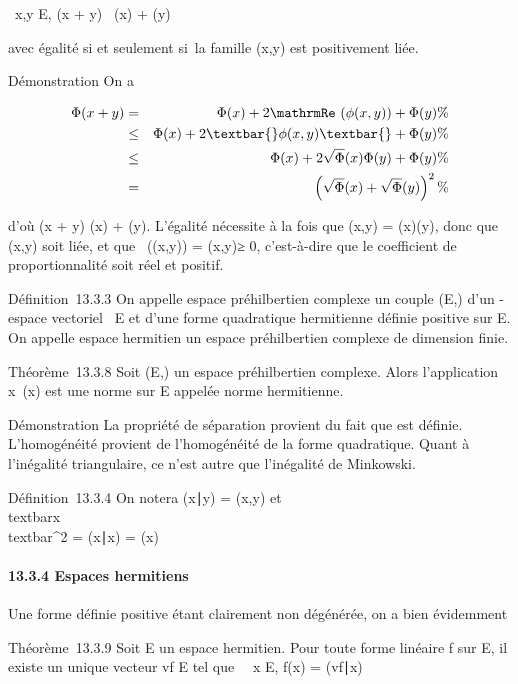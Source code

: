 \forall~x,y \in E, \sqrt\Phi(x + y)~
\leq\sqrt\Phi(x) + \sqrt\Phi(y)

avec égalité si et seulement si~la famille (x,y) est positivement liée.

Démonstration On a

\begin{align*} \Phi(x + y)& =& \Phi(x) +
2\mathrmRe~(\phi(x,y)) +
\Phi(y)\%& \\ & \leq& \Phi(x) +
2\textbar{}\phi(x,y)\textbar{} + \Phi(y) \%& \\
& \leq& \Phi(x) + 2\sqrt\Phi(x)\Phi(y) + \Phi(y)\%&
\\ & =& \left
(\sqrt\Phi(x) +
\sqrt\Phi(y)\right )^2 \%&
\\ \end{align*}

d'où \sqrt\Phi(x + y) \leq\sqrt\Phi(x) +
\sqrt\Phi(y). L'égalité nécessite à la fois que
\textbar{}\phi(x,y)\textbar{} = \sqrt\Phi(x)\Phi(y), donc que
(x,y) soit liée, et que
\mathrmRe~(\phi(x,y)) =
\textbar{}\phi(x,y)\textbar{}≥ 0, c'est-à-dire que le coefficient de
proportionnalité soit réel et positif.

Définition~13.3.3 On appelle espace préhilbertien complexe un couple
(E,\Phi) d'un -espace vectoriel ~E et d'une forme quadratique hermitienne
définie positive sur E. On appelle espace hermitien un espace
préhilbertien complexe de dimension finie.

Théorème~13.3.8 Soit (E,\Phi) un espace préhilbertien complexe. Alors
l'application x\mapsto~\sqrt\Phi(x)
est une norme sur E appelée norme hermitienne.

Démonstration La propriété de séparation provient du fait que \Phi est
définie. L'homogénéité provient de l'homogénéité de la forme
quadratique. Quant à l'inégalité triangulaire, ce n'est autre que
l'inégalité de Minkowski.

Définition~13.3.4 On notera (x∣y) = \phi(x,y) et
\\textbar{}x\\textbar{}^2 =
(x∣x) = \Phi(x)

\paragraph{13.3.4 Espaces hermitiens}

Une forme définie positive étant clairement non dégénérée, on a bien
évidemment

Théorème~13.3.9 Soit E un espace hermitien. Pour toute forme linéaire f
sur E, il existe un unique vecteur vf \in E tel que
\forall~~x \in E, f(x) =
(vf∣x)


